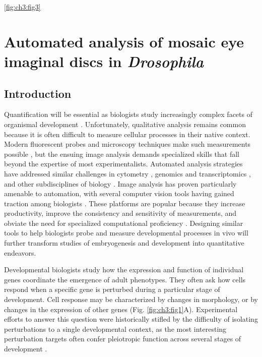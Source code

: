 \ref{fig:ch3:fig3} 


\chapter{Automated analysis of mosaic eye imaginal discs in \textit{Drosophila}}
\label{ch3:clones}


\section{Introduction}

Quantification will be essential as biologists study increasingly complex facets of organismal development \cite{Oates2009}. Unfortunately, qualitative analysis remains common because it is often difficult to measure cellular processes in their native context. Modern fluorescent probes and microscopy techniques make such measurements possible \cite{Muzzey2009,Stelzer2015,Truong2011}, but the ensuing image analysis demands specialized skills that fall beyond the expertise of most experimentalists. Automated analysis strategies have addressed similar challenges in cytometry \cite{Aghaeepour2013,Chen2015,Pyne2009}, genomics and transcriptomics \cite{Bernstein2008,Hellemans2007,Langmead2012,Trapnell2013}, and other subdisciplines of biology \cite{Costes2004,Kelley2015}. Image analysis has proven particularly amenable to automation, with several computer vision tools having gained traction among biologists \cite{Carpenter2006,Paintdakhi2016,Schindelin2012,Sommer2011}. These platforms are popular because they increase productivity, improve the consistency and sensitivity of measurements, and obviate the need for specialized computational proficiency \cite{Jug2014,Sbalzarini2016,Schindelin2015}. Designing similar tools to help biologists probe and measure developmental processes in vivo will further transform studies of embryogenesis and development into quantitative endeavors.

Developmental biologists study how the expression and function of individual genes coordinate the emergence of adult phenotypes. They often ask how cells respond when a specific gene is perturbed during a particular stage of development. Cell response may be characterized by changes in morphology, or by changes in the expression of other genes (Fig. \ref{fig:ch3:fig1}A). Experimental efforts to answer this question were historically stifled by the difficulty of isolating perturbations to a single developmental context, as the most interesting perturbation targets often confer pleiotropic function across several stages of development \cite{Simpson2002,Parody1993,Shilo1991}. 

